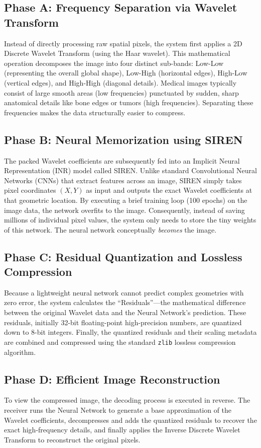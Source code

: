 \documentclass[12pt,a4paper]{article}
\begin{document}
\subsection*{Phase A: Frequency Separation via Wavelet Transform}
Instead of directly processing raw spatial pixels, the system first applies a 2D Discrete Wavelet Transform (using the Haar wavelet). This mathematical operation decomposes the image into four distinct sub-bands: Low-Low (representing the overall global shape), Low-High (horizontal edges), High-Low (vertical edges), and High-High (diagonal details). Medical images typically consist of large smooth areas (low frequencies) punctuated by sudden, sharp anatomical details like bone edges or tumors (high frequencies). Separating these frequencies makes the data structurally easier to compress.

\subsection*{Phase B: Neural Memorization using SIREN}
The packed Wavelet coefficients are subsequently fed into an Implicit Neural Representation (INR) model called SIREN. Unlike standard Convolutional Neural Networks (CNNs) that extract features across an image, SIREN simply takes pixel coordinates \((X, Y)\) as input and outputs the exact Wavelet coefficients at that geometric location. By executing a brief training loop (100 epochs) on the image data, the network overfits to the image. Consequently, instead of saving millions of individual pixel values, the system only needs to store the tiny weights of this network. The neural network conceptually \textit{becomes} the image.

\subsection*{Phase C: Residual Quantization and Lossless Compression}
Because a lightweight neural network cannot predict complex geometries with zero error, the system calculates the ``Residuals''—the mathematical difference between the original Wavelet data and the Neural Network's prediction. These residuals, initially 32-bit floating-point high-precision numbers, are quantized down to 8-bit integers. Finally, the quantized residuals and their scaling metadata are combined and compressed using the standard \texttt{zlib} lossless compression algorithm. 

\subsection*{Phase D: Efficient Image Reconstruction}
To view the compressed image, the decoding process is executed in reverse. The receiver runs the Neural Network to generate a base approximation of the Wavelet coefficients, decompresses and adds the quantized residuals to recover the exact high-frequency details, and finally applies the Inverse Discrete Wavelet Transform to reconstruct the original pixels.
\end{document}

